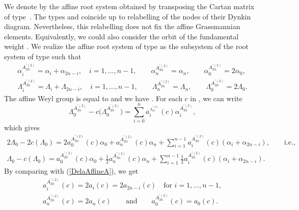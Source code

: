 \documentclass[10pt,a4paper]{amsart}
\numberwithin{equation}{section}
\begin{document}
We denote by  the affine root system obtained by
transposing the Cartan matrix of type~. The types 
and  coincide up to relabelling of the
nodes of their Dynkin diagram. Nevertheless, this relabelling does not fix
the affine Grassmannian elements. Equivalently, we could also consider the
orbit of the fundamental weight . We realize
the affine root system of type  as the subsystem of the
root system of type  such that%
\begin{gather*}
\alpha _{i}^{A_{2n}^{\prime (2)}}=\alpha _{i}+\alpha _{2n-i},\quad i=1,\dots ,n-1,
\qquad
\alpha _{n}^{A_{2n}^{\prime (2)}}=\alpha _{n}, \qquad
\alpha _{0}^{A_{2n}^{\prime (2)}}=2\alpha _{0},\\
\Lambda _{i}^{A_{2n}^{\prime (2)}}=\Lambda _{i}+\Lambda _{2n-i},\quad i=1,\dots,n-1, \qquad
\Lambda _{n}^{A_{2n}^{\prime (2)}}=\Lambda _{n}, \qquad
\Lambda _{0}^{A_{2n}^{\prime (2)}}=2\Lambda _{0}.
\end{gather*}
The affine Weyl group  is equal to 
and we have . For
each $c$ in , we can write
\begin{equation*}
\Lambda _{0}^{A_{2n}^{\prime (2)}}-c\bigl(\Lambda _{0}^{A_{2n}^{\prime
		(2)}}\bigr)=\sum_{i=0}^{n}a_{i}^{_{A_{2n}^{\prime (2)}}}(c)\alpha
_{i}^{A_{2n}^{\prime (2)}},
\end{equation*}
which gives
\begin{gather*}
	2\Lambda _{0}-2c(\Lambda _{0}) =2a_{0}^{A_{2n}^{\prime (2)}}(c)\alpha
	_{0}+a_{n}^{A_{2n}^{\prime (2)}}(c)\alpha
	_{n}+\sum_{i=1}^{n-1}a_{i}^{A_{2n}^{\prime (2)}}(c)(\alpha _{i}+\alpha
	_{2n-i}),\qquad \text{i.e.,} \\
	\Lambda _{0}-c(\Lambda _{0}) =a_{0}^{A_{2n}^{\prime (2)}}(c)\alpha _{0}+
	\frac{1}{2}a_{n}^{A_{2n}^{\prime (2)}}(c)\alpha _{n}+\sum_{i=1}^{n-1}\frac{1%
	}{2 }a_{i}^{A_{2n}^{\prime (2)}}(c)(\alpha _{i}+\alpha _{2n-i}).
\end{gather*}
By comparing with (\ref{DelaAffineA}), we get%
\begin{gather*}
a_{i}^{A_{2n}^{\prime (2)}}(c)=2a_{i}(c)=2a_{2n-i}(c)\quad \text{for }i=1,\dots
,n-1 ,\\
a_{n}^{A_{2n}^{\prime (2)}}(c)=2a_{n}(c)\qquad \text{and} \qquad a_{0}^{A_{2n}^{\prime
		(2)}}(c)=a_{0}(c).
\end{gather*}
\end{document}

